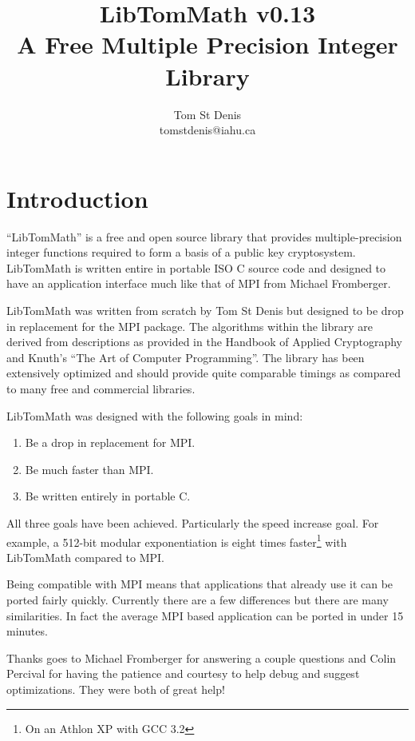 \documentclass{article}
\begin{document}
\title{LibTomMath v0.13 \\ A Free Multiple Precision Integer Library}
\author{Tom St Denis \\ tomstdenis@iahu.ca}
\maketitle
\newpage

\section{Introduction}
``LibTomMath'' is a free and open source library that provides multiple-precision integer functions required to form a basis
of a public key cryptosystem.  LibTomMath is written entire in portable ISO C source code and designed to have an application
interface much like that of MPI from Michael Fromberger.  

LibTomMath was written from scratch by Tom St Denis but designed to be  drop in replacement for the MPI package.  The 
algorithms within the library are derived from descriptions as provided in the Handbook of Applied Cryptography and Knuth's
``The Art of Computer Programming''.  The library has been extensively optimized and should provide quite comparable 
timings as compared to many free and commercial libraries.

LibTomMath was designed with the following goals in mind:
\begin{enumerate}
\item Be a drop in replacement for MPI.
\item Be much faster than MPI.
\item Be written entirely in portable C.
\end{enumerate}

All three goals have been achieved.  Particularly the speed increase goal.  For example, a 512-bit modular exponentiation 
is eight times faster\footnote{On an Athlon XP with GCC 3.2} with LibTomMath compared to MPI.

Being compatible with MPI means that applications that already use it can be ported fairly quickly.  Currently there are 
a few differences but there are many similarities.  In fact the average MPI based application can be ported in under 15
minutes.  

Thanks goes to Michael Fromberger for answering a couple questions and Colin Percival for having the patience and courtesy to
help debug and suggest optimizations.  They were both of great help!
\end{document}

